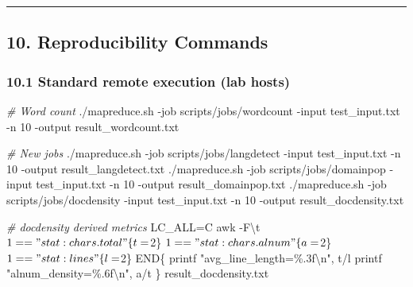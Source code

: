 \documentclass[
]{article}
\newenvironment{Shaded}{}{}
\newcommand{\AttributeTok}[1]{\textcolor[rgb]{0.49,0.56,0.16}{#1}}
\newcommand{\CommentTok}[1]{\textcolor[rgb]{0.38,0.63,0.69}{\textit{#1}}}
\newcommand{\ExtensionTok}[1]{#1}
\newcommand{\FunctionTok}[1]{\textcolor[rgb]{0.02,0.16,0.49}{#1}}
\newcommand{\NormalTok}[1]{#1}
\newcommand{\OperatorTok}[1]{\textcolor[rgb]{0.40,0.40,0.40}{#1}}
\newcommand{\StringTok}[1]{\textcolor[rgb]{0.25,0.44,0.63}{#1}}
\newcommand{\VariableTok}[1]{\textcolor[rgb]{0.10,0.09,0.49}{#1}}
\begin{document}
\begin{center}\rule{0.5\linewidth}{0.5pt}\end{center}

\subsection{10. Reproducibility
Commands}\label{reproducibility-commands}

\subsubsection{10.1 Standard remote execution (lab
hosts)}\label{standard-remote-execution-lab-hosts}

\begin{Shaded}
\begin{Highlighting}[]
\CommentTok{\# Word count}
\ExtensionTok{./mapreduce.sh} \AttributeTok{{-}job}\NormalTok{ scripts/jobs/wordcount }\AttributeTok{{-}input}\NormalTok{ test\_input.txt }\AttributeTok{{-}n}\NormalTok{ 10 }\AttributeTok{{-}output}\NormalTok{ result\_wordcount.txt}

\CommentTok{\# New jobs}
\ExtensionTok{./mapreduce.sh} \AttributeTok{{-}job}\NormalTok{ scripts/jobs/langdetect }\AttributeTok{{-}input}\NormalTok{ test\_input.txt }\AttributeTok{{-}n}\NormalTok{ 10 }\AttributeTok{{-}output}\NormalTok{ result\_langdetect.txt}
\ExtensionTok{./mapreduce.sh} \AttributeTok{{-}job}\NormalTok{ scripts/jobs/domainpop  }\AttributeTok{{-}input}\NormalTok{ test\_input.txt }\AttributeTok{{-}n}\NormalTok{ 10 }\AttributeTok{{-}output}\NormalTok{ result\_domainpop.txt}
\ExtensionTok{./mapreduce.sh} \AttributeTok{{-}job}\NormalTok{ scripts/jobs/docdensity }\AttributeTok{{-}input}\NormalTok{ test\_input.txt }\AttributeTok{{-}n}\NormalTok{ 10 }\AttributeTok{{-}output}\NormalTok{ result\_docdensity.txt}

\CommentTok{\# docdensity derived metrics}
\VariableTok{LC\_ALL}\OperatorTok{=}\NormalTok{C }\FunctionTok{awk} \AttributeTok{{-}F}\StringTok{\textquotesingle{}\textbackslash{}t\textquotesingle{}} \StringTok{\textquotesingle{}}
\StringTok{$1=="stat:chars.total"\{t=$2\}}
\StringTok{$1=="stat:chars.alnum"\{a=$2\}}
\StringTok{$1=="stat:lines"\{l=$2\}}
\StringTok{END\{}
\StringTok{   printf "avg\_line\_length=\%.3f\textbackslash{}n", t/l}
\StringTok{   printf "alnum\_density=\%.6f\textbackslash{}n", a/t}
\StringTok{\}\textquotesingle{}}\NormalTok{ result\_docdensity.txt}
\end{Highlighting}
\end{Shaded}
\end{document}
